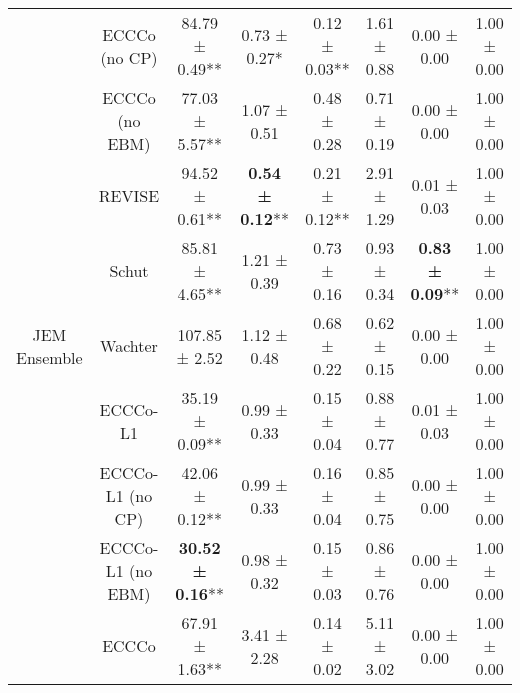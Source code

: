 \begin{table}
{\begin{tabular}[t]{cccccccc}
 & ECCCo (no CP) & 84.79 ± 0.49** & 0.73 ± 0.27*\hphantom{*} & 0.12 ± 0.03** & 1.61 ± 0.88\hphantom{*}\hphantom{*} & 0.00 ± 0.00\hphantom{*}\hphantom{*} & 1.00 ± 0.00\hphantom{*}\hphantom{*}\\

 & ECCCo (no EBM) & 77.03 ± 5.57** & 1.07 ± 0.51\hphantom{*}\hphantom{*} & 0.48 ± 0.28\hphantom{*}\hphantom{*} & 0.71 ± 0.19\hphantom{*}\hphantom{*} & 0.00 ± 0.00\hphantom{*}\hphantom{*} & 1.00 ± 0.00\hphantom{*}\hphantom{*}\\

 & REVISE & 94.52 ± 0.61** & \textbf{0.54 ± 0.12}** & 0.21 ± 0.12** & 2.91 ± 1.29\hphantom{*}\hphantom{*} & 0.01 ± 0.03\hphantom{*}\hphantom{*} & 1.00 ± 0.00\hphantom{*}\hphantom{*}\\

 & Schut & 85.81 ± 4.65** & 1.21 ± 0.39\hphantom{*}\hphantom{*} & 0.73 ± 0.16\hphantom{*}\hphantom{*} & 0.93 ± 0.34\hphantom{*}\hphantom{*} & \textbf{0.83 ± 0.09}** & 1.00 ± 0.00\hphantom{*}\hphantom{*}\\

\multirow[t]{-10}{*}{\centering\arraybackslash JEM Ensemble} & Wachter & 107.85 ± 2.52\hphantom{*}\hphantom{*} & 1.12 ± 0.48\hphantom{*}\hphantom{*} & 0.68 ± 0.22\hphantom{*}\hphantom{*} & 0.62 ± 0.15\hphantom{*}\hphantom{*} & 0.00 ± 0.00\hphantom{*}\hphantom{*} & 1.00 ± 0.00\hphantom{*}\hphantom{*}\\
\cmidrule{1-8}
 & ECCCo-L1 & 35.19 ± 0.09** & 0.99 ± 0.33\hphantom{*}\hphantom{*} & 0.15 ± 0.04\hphantom{*}\hphantom{*} & 0.88 ± 0.77\hphantom{*}\hphantom{*} & 0.01 ± 0.03\hphantom{*}\hphantom{*} & 1.00 ± 0.00\hphantom{*}\hphantom{*}\\

 & ECCCo-L1 (no CP) & 42.06 ± 0.12** & 0.99 ± 0.33\hphantom{*}\hphantom{*} & 0.16 ± 0.04\hphantom{*}\hphantom{*} & 0.85 ± 0.75\hphantom{*}\hphantom{*} & 0.00 ± 0.00\hphantom{*}\hphantom{*} & 1.00 ± 0.00\hphantom{*}\hphantom{*}\\

 & ECCCo-L1 (no EBM) & \textbf{30.52 ± 0.16}** & 0.98 ± 0.32\hphantom{*}\hphantom{*} & 0.15 ± 0.03\hphantom{*}\hphantom{*} & 0.86 ± 0.76\hphantom{*}\hphantom{*} & 0.00 ± 0.00\hphantom{*}\hphantom{*} & 1.00 ± 0.00\hphantom{*}\hphantom{*}\\

 & ECCCo & 67.91 ± 1.63** & 3.41 ± 2.28\hphantom{*}\hphantom{*} & 0.14 ± 0.02\hphantom{*}\hphantom{*} & 5.11 ± 3.02\hphantom{*}\hphantom{*} & 0.00 ± 0.00\hphantom{*}\hphantom{*} & 1.00 ± 0.00\hphantom{*}\hphantom{*}\\


\end{tabular}}
\end{table}
